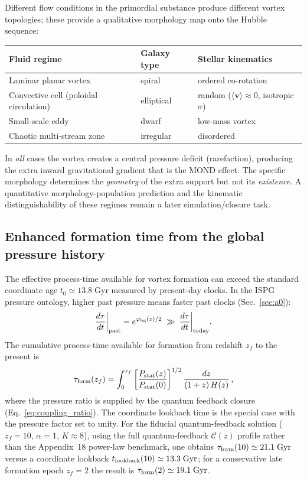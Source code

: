 \documentclass[11pt]{article}
\begin{document}
Different flow conditions in the primordial substance produce
different vortex topologies; these provide a qualitative morphology map
onto the Hubble sequence:
\begin{center}
\begin{tabular}{@{}lll@{}}
\toprule
\textbf{Fluid regime} & \textbf{Galaxy type} & \textbf{Stellar kinematics} \\
\midrule
Laminar planar vortex & spiral & ordered co-rotation \\
Convective cell (poloidal circulation) & elliptical & random ($\langle\mathbf{v}\rangle\approx 0$, isotropic $\sigma$) \\
Small-scale eddy & dwarf & low-mass vortex \\
Chaotic multi-stream zone & irregular & disordered \\
\bottomrule
\end{tabular}
\end{center}
In \emph{all} cases the vortex creates a central pressure deficit
(rarefaction), producing the extra inward gravitational gradient
that is the MOND effect.  The specific morphology determines the
\emph{geometry} of the extra support but not its \emph{existence}.  A
quantitative morphology-population prediction and the kinematic
distinguishability of these regimes remain a later simulation/closure
task.

\subsection{Enhanced formation time from the global pressure history}\label{sec:formation_time}

The effective process-time available for vortex formation can exceed
the standard coordinate age $t_0\simeq13.8\;\mathrm{Gyr}$ measured by
present-day clocks.
In the ISPG pressure ontology, higher past pressure means faster past
clocks (Sec.~\ref{sec:a0}):
\begin{equation}
  \frac{d\tau}{dt}\bigg|_{\rm past}
  = e^{\phi_{\rm bg}(z)/2}\;\gg\;
  \frac{d\tau}{dt}\bigg|_{\rm today}.
\end{equation}
The cumulative process-time available for formation from redshift $z_f$
to the present is
\begin{equation}\label{eq:tau_form}
  \tau_{\rm form}(z_f)
  = \int_0^{z_f}
    \left[\frac{P_{\rm stat}(z)}{P_{\rm stat}(0)}\right]^{1/2}
    \frac{dz}{(1+z)\,H(z)}\,,
\end{equation}
where the pressure ratio is supplied by the quantum feedback closure
(Eq.~\ref{eq:coupling_ratio}).  The coordinate lookback time is
the special case with the pressure factor set to unity.
For the fiducial quantum-feedback solution
($z_f=10$, $\alpha=1$, $K\approx 8$), using the full
quantum-feedback $\mathcal{C}(z)$ profile rather than the
Appendix~18 power-law benchmark, one obtains
$\tau_{\rm form}(10)\simeq 21.1\;\mathrm{Gyr}$ versus a coordinate
lookback $t_{\rm lookback}(10)\simeq 13.3\;\mathrm{Gyr}$; for a
conservative late formation epoch $z_f=2$ the result is
$\tau_{\rm form}(2)\simeq 19.1\;\mathrm{Gyr}$.
\end{document}

